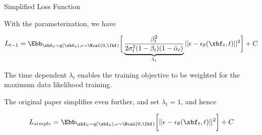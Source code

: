 \documentclass[aspectratio=169,xcolor=dvipsnames,svgnames,x11names,fleqn]{beamer}
\begin{document}
\begin{frame}{Simplified Loss Function}

With the parameterization, we have

\begin{align*}
L_{t-1} = \Ebb_{\xbf_0 \sim q(\xbf_0), \epsilon\sim \Ncal(0,\Ibf) }\bigg[ \underbrace{\frac{\beta_t^2}{2\sigma_t^2(1 - \beta_t)(1-\bar{\alpha}_t)}}_{\lambda_t} || \epsilon - \epsilon_\theta(\xbf_t, t)||^2 \bigg] + C
\end{align*}

The time dependent $\lambda_t$ enables the training objective to be weighted for the maximum data likelihood training.

\vspace{10pt}

The original paper simplifies even further, and set $\lambda_t = 1$, and hence


\begin{align*}
L_{simple} = \Ebb_{\xbf_0 \sim q(\xbf_0), \epsilon\sim \Ncal(0,\Ibf) }\bigg[ || \epsilon - \epsilon_\theta(\xbf_t, t)||^2 \bigg] + C
\end{align*}


\end{frame} 

\newcommand{\redbox}[1]{%
  \tikz[baseline=(char.base)]
  \node[draw=red, rectangle, inner sep=2pt, thick] (char) {#1};
}
\end{document}
